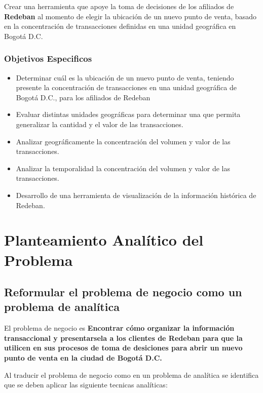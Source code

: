 \documentclass[a4paper]{article}
\begin{document}
Crear una herramienta que apoye la toma de decisiones de los afiliados de \textbf{Redeban} al momento de elegir la ubicación de un nuevo punto de venta, basado en la concentración de transacciones definidas en una unidad geográfica en Bogotá D.C.

\subsubsection{Objetivos Especificos}
\begin{itemize}
	\item Determinar cuál es la ubicación de un nuevo punto de venta, teniendo presente la concentración de transacciones en una unidad geográfica de Bogotá D.C., para los afiliados de Redeban
	\item Evaluar distintas unidades geográficas para determinar una que permita generalizar la cantidad y el valor de las transacciones.
	\item Analizar geográficamente la concentración del volumen y valor de las transacciones.
	\item Analizar la temporalidad la concentración del volumen y valor de las transacciones.
	\item Desarrollo de una herramienta de visualización de la información histórica de Redeban.
\end{itemize}
\section{Planteamiento Analítico del Problema}
\subsection{Reformular el problema de negocio como un problema de analítica}

El problema de negocio es \textbf{Encontrar cómo organizar la información transaccional y presentarsela a los clientes de Redeban para que la utilicen en sus procesos de toma de desiciones para abrir un nuevo punto de venta en la ciudad de Bogotá D.C.}

Al traducir el problema de negocio como en un problema de analítica se identifica que se deben aplicar las siguiente tecnicas analíticas:
\end{document}
